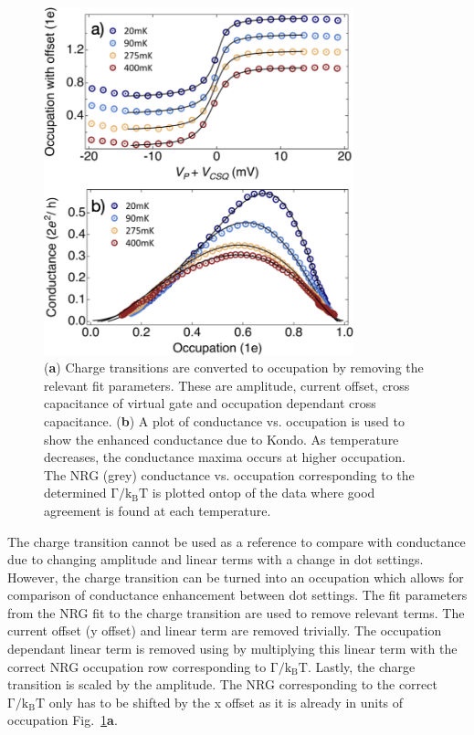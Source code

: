 \begin{figure}[!bht]
  \begin{center}
    \includegraphics[width=0.8\textwidth]{figures/ch3/crop_FiguresMaster.014.png}
    \caption[Method to determine occupation and plot conductance vs. occupation]{\label{fig:ch3/cond_vs_occ_gf} 
    (\textbf{a}) Charge transitions are converted to occupation by removing the relevant fit parameters. These are amplitude, current offset, cross capacitance of virtual gate and occupation dependant cross capacitance. (\textbf{b}) A plot of conductance vs. occupation is used to show the enhanced conductance due to Kondo. As temperature decreases, the conductance maxima occurs at higher occupation. The NRG (grey) conductance vs. occupation corresponding to the determined $\mathrm{\Gamma/k_BT}$ is plotted ontop of the data where good agreement is found at each temperature.}
  \end{center}
\end{figure}

The charge transition cannot be used as a reference to compare with conductance due to changing amplitude and linear terms with a change in dot settings. However, the charge transition can be turned into an occupation which allows for comparison of conductance enhancement between dot settings. The fit parameters from the NRG fit to the charge transition are used to remove relevant terms. The current offset (y offset) and linear term are removed trivially. The occupation dependant linear term is removed using by multiplying this linear term with the correct NRG occupation row corresponding to $\mathrm{\Gamma/k_BT}$. Lastly, the charge transition is scaled by the amplitude. The NRG corresponding to the correct $\mathrm{\Gamma/k_BT}$ only has to be shifted by the x offset as it is already in units of occupation Fig.~\ref{fig:ch3/cond_vs_occ_gf}\textbf{a}.


